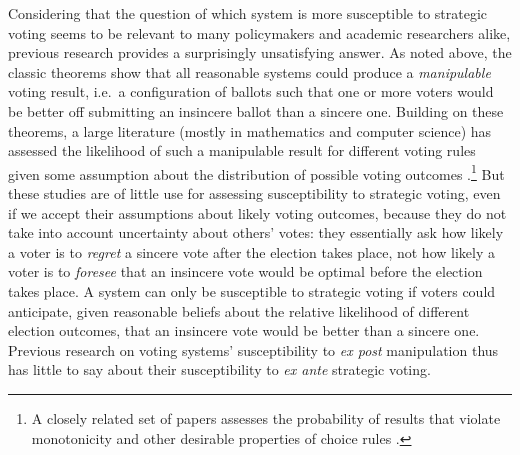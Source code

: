 \documentclass[11pt,a4paper]{article}
\begin{document}
Considering that the question of which system is more susceptible to strategic voting seems to be relevant to many policymakers and academic researchers alike, previous research provides a surprisingly unsatisfying answer.  As noted above, the classic theorems show that all reasonable systems could produce a \emph{manipulable} voting result, i.e.\ a configuration of ballots such that one or more voters would be better off submitting an insincere ballot than a sincere one. Building on these theorems, a large literature (mostly in mathematics and computer science) has assessed the likelihood of such a manipulable result for different voting rules given some assumption about the distribution of possible voting outcomes \citep[e.g.][]{chamberlin1985investigation,nitzan1985vulnerability,saari1990susceptibility,favardin2006some}.\footnote{A closely related set of papers assesses the probability of results that violate monotonicity and other desirable properties of choice rules \citep{plassmann2014frequently,ornstein2014frequency,miller2017closeness}.} %
But these studies are of little use for assessing susceptibility to strategic voting, even if we accept their assumptions about likely voting outcomes, because they do not take into account uncertainty about others' votes: they essentially ask how likely a voter is to \emph{regret} a sincere vote after the election takes place, not how likely a voter is to \emph{foresee} that an insincere vote would be optimal before the election takes place. A system can only be susceptible to strategic voting if voters could anticipate, given reasonable beliefs about the relative likelihood of different election outcomes, that an insincere vote would be better than a sincere one. Previous research on voting systems' susceptibility to \emph{ex post} manipulation thus has little to say about their susceptibility to \emph{ex ante} strategic voting. %
\end{document}

